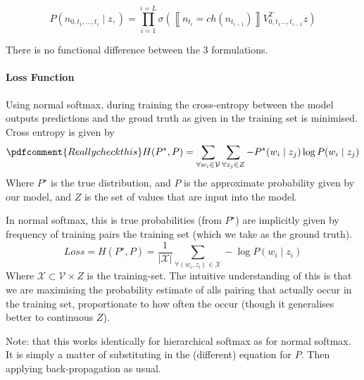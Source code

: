 \documentclass[parskip]{komatufte}
\begin{document}
\begin{equation}
P(n_{0,t_{1},...,t_{i}}\mid z,)=\prod_{i=1}^{i=L}\sigma\left(\left\llbracket n_{t_{i}}=ch(n_{t_{i-1}})\right\rrbracket V_{0,t_{1}...,t_{i-1}}^{T}z\right)
\end{equation}


There is no functional difference between the 3 formulations.

\paragraph{Loss Function}


Using normal softmax, during training the cross-entropy between the model outputs predictions and the groud truth as given in the training set is minimised.
Cross entropy is given by
\begin{equation} \pdfcomment{Really check this}
H(P^\star, P) = \sum_{\forall w_i\in \mathcal{V}} \sum_{\forall z_j \in Z} -P^\star(w_i \mid z_j) \log P(w_i \mid z_j)
\end{equation}
Where $P^\star$ is the true distribution, and $P$ is the approximate probability given by our model,
and $Z$ is the set of values that are input into the model.

In normal softmax, this is true probabilities (from $P^\star$) are implicitly given by frequency of training pairs the training set (which we take as the ground truth).
\begin{equation}
Loss=H(P^\star, P) = \frac{1}{|\mathcal{X}|} \sum_{\forall (w_i, z_i) \in \mathcal{X}} -\log P(w_i \mid z_i)
\end{equation}
Where $\mathcal{X} \subset \mathcal{V} \times Z$ is the training-set.
The intuitive understanding of this is that we are maximising the probability estimate of alls pairing that actually occur in the training set, proportionate to how often the occur (though it generalises better to continuous $Z$).

Note: that this works identically for hierarchical softmax as for normal softmax.
It is simply a matter of substituting in the (different) equation for $P$.
Then applying back-propagation as usual.
\end{document}
